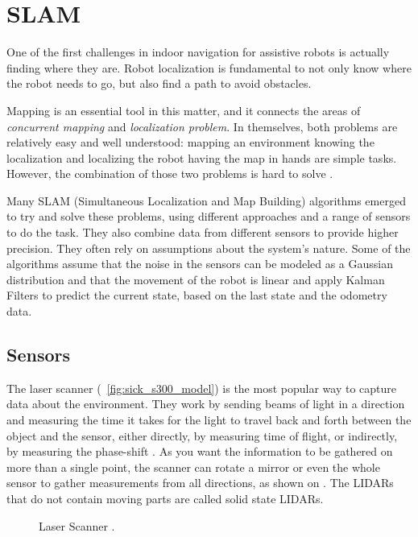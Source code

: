 \chapter{SLAM}\label{chp:slam_mapping}

One of the first challenges in indoor navigation for assistive robots is actually finding where they are. Robot localization is fundamental to not only know where the robot needs to go, but also find a path to avoid obstacles.

Mapping is an essential tool in this matter, and it connects the areas of \textit{concurrent mapping} and \textit{localization problem}. In themselves, both problems are relatively easy and well understood: mapping an environment knowing the localization and localizing the robot having the map in hands are simple tasks. However, the combination of those two problems is hard to solve \cite{thrun2000real}.

Many SLAM (Simultaneous Localization and
Map Building) algorithms emerged to try and solve these problems, using different approaches and a range of sensors to do the task. They also combine data from different sensors to provide higher precision. They often rely on assumptions about the system's nature. Some of the algorithms assume that the noise in the sensors can be modeled as a Gaussian distribution and that the movement of the robot is linear and apply Kalman Filters to predict the current state, based on the last state and the odometry data.

\section{Sensors}

The laser scanner (\figurename~\ref{fig:sick_s300_model}) is the most popular way to capture data about the environment. They work by sending beams of light in a direction and measuring the time it takes for the light to travel back and forth between the object and the sensor, either directly, by measuring time of flight, or indirectly, by measuring the phase-shift \cite{amann2001laser}. As you want the information to be gathered on more than a single point, the scanner can rotate a mirror or even the whole sensor to gather measurements from all directions, as shown on . The LIDARs that do not contain moving parts are called solid state LIDARs.

\begin{figure}
     \centering
     \caption{Laser Scanner \cite{sicks300}.}
     \label{fig:sick_s300}
\end{figure}

